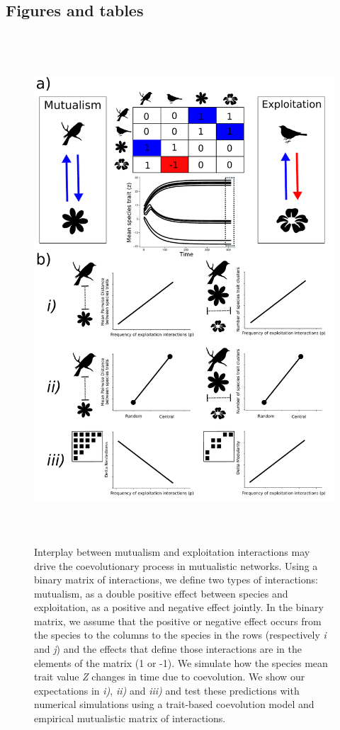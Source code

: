 \documentclass[a4paper, 12pt]{article}
\begin{document}
\subsection*{Figures and tables}
\newpage
\begin{singlespace}
\begin{figure}[H]
  \includegraphics[width = \linewidth, height = 19cm]{New_Figura_1.pdf}
  \vspace*{-7mm}
  \caption{Interplay between mutualism and exploitation interactions may drive the coevolutionary process in mutualistic networks. Using a binary matrix of interactions, we define two types of interactions: mutualism, as a double positive effect between species and exploitation, as a positive and negative effect jointly. In the binary matrix, we assume that the positive or negative effect occurs from the species to the columns to the species in the rows (respectively \textit{i} and \textit{j}) and the effects that define those interactions are in the elements of the matrix (1 or -1). We simulate how the species mean trait value \textit{Z} changes in time due to coevolution. We show our expectations in \textit{i)}, \textit{ii)} and \textit{iii)} and test these predictions with numerical simulations using a trait-based coevolution model and empirical mutualistic matrix of interactions. }
  \label{fig:1}
\end{figure}


\end{singlespace}
\end{document}
